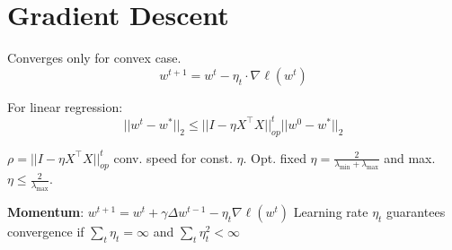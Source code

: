 \section*{Gradient Descent}
Converges only for convex case. 
\[
	w^{t+1} = w^t - \eta_t \cdot \nabla \ell(w^t)
\]

For linear regression:
\[
	||w^t - w^*||_2 \leq ||I - \eta X^\top X||_{op}^t ||w^0 - w^*||_2
\]

$\rho = ||I - \eta X^\top X||_{op}^t$ conv. speed for const. $\eta$. Opt. fixed $\eta = \frac{2}{\lambda_{\text{min}} + \lambda_{\text{max}}}$ and max. $\eta \leq \frac{2}{\lambda_{\text{max}}}$. 

\textbf{Momentum}: $w^{t+1} = w^t + \gamma \Delta w^{t-1} - \eta_t \nabla \ell(w^t)$
Learning rate $\eta_t$ guarantees convergence if $\sum_t \eta_t = \infty$ and $\sum_t \eta_t^2 < \infty$
